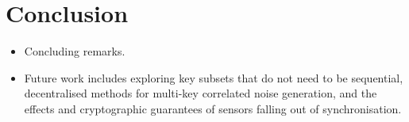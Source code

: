\documentclass[conference]{IEEEtran}
\theoremstyle{definition}
\theoremstyle{remark}
\begin{document}
\section{Conclusion}\label{sec:conc}
\begin{itemize}
  \item Concluding remarks.
  \item Future work includes exploring key subsets that do not need to be sequential, decentralised methods for multi-key correlated noise generation, and the effects and cryptographic guarantees of sensors falling out of synchronisation.
\end{itemize}



% 
%                                            
%                                            
%                                            
% 




\end{document}
